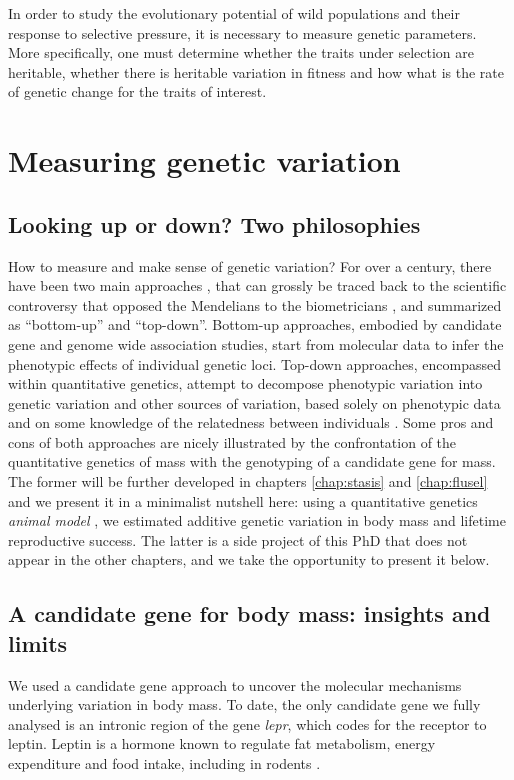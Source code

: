 In order to study the evolutionary potential of wild populations and their response to selective pressure, it is necessary to measure genetic parameters. More specifically, one must determine whether the traits under selection are heritable, whether there is heritable variation in fitness and how what is the rate of genetic change for the traits of interest. 

\section{Measuring genetic variation}
\subsection{Looking up or down? Two philosophies}
How to measure and make sense of genetic variation?
For over a century, there have been two main approaches \parencite{Liedvogel2012}, that can grossly be traced back to the scientific controversy that opposed the Mendelians to the biometricians \parencite{Dietrich2006}, and summarized as ``bottom-up'' and ``top-down''. 
Bottom-up approaches, embodied by candidate gene and genome wide association studies, start from molecular data to infer the phenotypic effects of individual genetic loci. 
Top-down approaches, encompassed within quantitative genetics, attempt to decompose phenotypic variation into genetic variation and other sources of variation, based solely on phenotypic data and on some knowledge of the relatedness between individuals \parencite{Lynch1998}. 
Some pros and cons of both approaches are nicely illustrated by the confrontation of the quantitative genetics of mass with the genotyping of a candidate gene for mass. The former will be further developed in chapters \ref{chap:stasis} and \ref{chap:flusel} and we present it in a minimalist nutshell here: using a quantitative genetics \emph{animal model} \parencite{Henderson1950, Kruuk2004}, we estimated additive genetic variation in body mass and lifetime reproductive success. The latter is a side project of this PhD that does not appear in the other chapters, and we take the opportunity to present it below.

\subsection{A candidate gene for body mass: insights and limits}
We used a candidate gene approach \parencite{Fitzpatrick2005} to uncover the molecular mechanisms underlying variation in body mass. To date, the only candidate gene we fully analysed is an intronic region of the gene \emph{lepr}, which codes for the receptor to leptin. Leptin is a hormone known to regulate fat metabolism, energy expenditure and food intake, including in rodents \parencite{Houseknecht1998}.

